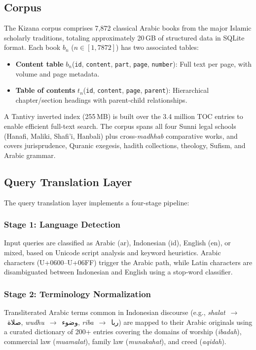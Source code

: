 \documentclass[preprint,12pt,numbers]{elsarticle}
\newcommand{\ar}[1]{{\arabicfont #1}}
\begin{document}
\subsection{Corpus}

The Kizana corpus comprises 7,872 classical Arabic books from the major Islamic scholarly traditions, totaling approximately 20\,GB of structured data in SQLite format. Each book $b_n$ ($n \in [1, 7872]$) has two associated tables:

\begin{itemize}
    \item \textbf{Content table} $b_n$(\texttt{id}, \texttt{content}, \texttt{part}, \texttt{page}, \texttt{number}): Full text per page, with volume and page metadata.
    \item \textbf{Table of contents} $t_n$(\texttt{id}, \texttt{content}, \texttt{page}, \texttt{parent}): Hierarchical chapter/section headings with parent-child relationships.
\end{itemize}

A Tantivy inverted index (255\,MB) is built over the 3.4 million TOC entries to enable efficient full-text search. The corpus spans all four Sunni legal schools (Hanafi, Maliki, Shafi'i, Hanbali) plus cross-\textit{madhhab} comparative works, and covers jurisprudence, Quranic exegesis, hadith collections, theology, Sufism, and Arabic grammar.

\subsection{Query Translation Layer}
\label{sec:translation}

The query translation layer implements a four-stage pipeline:

\subsubsection{Stage 1: Language Detection}
Input queries are classified as Arabic (ar), Indonesian (id), English (en), or mixed, based on Unicode script analysis and keyword heuristics. Arabic characters (U+0600--U+06FF) trigger the Arabic path, while Latin characters are disambiguated between Indonesian and English using a stop-word classifier.

\subsubsection{Stage 2: Terminology Normalization}
Transliterated Arabic terms common in Indonesian discourse (e.g., \textit{shalat}~$\rightarrow$~\ar{صلاة}, \textit{wudhu}~$\rightarrow$~\ar{وضوء}, \textit{riba}~$\rightarrow$~\ar{ربا}) are mapped to their Arabic originals using a curated dictionary of 200+ entries covering the domains of worship (\textit{ibadah}), commercial law (\textit{muamalat}), family law (\textit{munakahat}), and creed (\textit{aqidah}).
\end{document}
